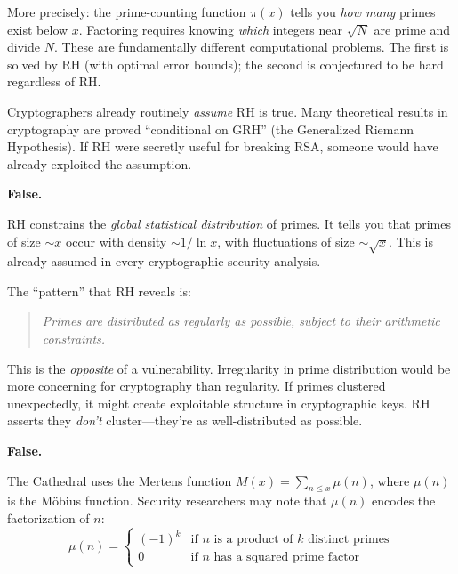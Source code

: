 \documentclass[11pt,a4paper]{article}
\begin{document}
More precisely: the prime-counting function $\pi(x)$ tells you
\emph{how many} primes exist below $x$. Factoring requires knowing
\emph{which} integers near $\sqrt{N}$ are prime and divide $N$.
These are fundamentally different computational problems. The first
is solved by RH (with optimal error bounds); the second is
conjectured to be hard regardless of RH.

\begin{remark}
Cryptographers already routinely \emph{assume} RH is true. Many
theoretical results in cryptography are proved ``conditional on GRH''
(the Generalized Riemann Hypothesis). If RH were secretly useful for
breaking RSA, someone would have already exploited the assumption.
\end{remark}

\begin{myth}
\label{myth:pattern}
\textbf{False.}
\end{myth}

RH constrains the \emph{global statistical distribution} of primes.
It tells you that primes of size $\sim x$ occur with density
$\sim 1/\ln x$, with fluctuations of size $\sim \sqrt{x}$. This is
already assumed in every cryptographic security analysis.

The ``pattern'' that RH reveals is:
\begin{quote}
\emph{Primes are distributed as regularly as possible, subject to
their arithmetic constraints.}
\end{quote}

This is the \emph{opposite} of a vulnerability. Irregularity in
prime distribution would be more concerning for cryptography than
regularity. If primes clustered unexpectedly, it might create
exploitable structure in cryptographic keys. RH asserts they
\emph{don't} cluster---they're as well-distributed as possible.

\begin{myth}
\label{myth:mobius}
\textbf{False.}
\end{myth}

The Cathedral uses the Mertens function $M(x) = \sum_{n \leq x} \mu(n)$,
where $\mu(n)$ is the M\"obius function. Security researchers may note
that $\mu(n)$ encodes the factorization of $n$:
\[
  \mu(n) = \begin{cases}
    (-1)^k & \text{if } n \text{ is a product of } k \text{ distinct primes} \\
    0 & \text{if } n \text{ has a squared prime factor}
  \end{cases}
\]
\end{document}
